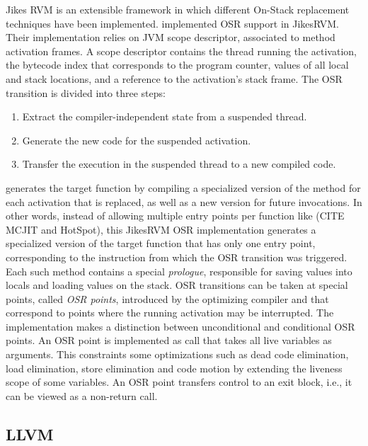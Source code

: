 Jikes RVM is an extensible framework in which different On-Stack replacement techniques have been implemented.
 implemented OSR support in JikesRVM. 
Their implementation relies on JVM scope descriptor, associated to method activation frames.
A scope descriptor contains the thread running the activation, the bytecode index that corresponds to the program counter, values of all local and stack locations, and a reference to the activation's stack frame.
The OSR transition is divided into three steps: 
\begin{enumerate}
    \item Extract the compiler-independent state from a suspended thread. 
    \item Generate the new code for the suspended activation.
    \item Transfer the execution in the suspended thread to a new compiled code.
\end{enumerate}
 generates the target function by compiling a specialized version of the method for each activation that is replaced, as well as a new version for future invocations.
In other words, instead of allowing multiple entry points per function like (CITE MCJIT and HotSpot), this JikesRVM OSR implementation generates a specialized version of the target function that has only one entry point, corresponding to the instruction from which the OSR transition was triggered.
Each such method contains a special \textit{prologue}, responsible for saving values into locals and loading values on the stack.
OSR transitions can be taken at special points, called \textit{OSR points}, introduced by the optimizing compiler and that correspond to points where the running activation may be interrupted.
The implementation makes a distinction between unconditional and conditional OSR points.
An OSR point is implemented as call that takes all live variables as arguments. 
This constraints some optimizations such as dead code elimination, load elimination, store elimination and code motion by extending the liveness scope of some variables.
An OSR point transfers control to an exit block, i.e., it can be viewed as a non-return call.\\



\subsection{LLVM}
